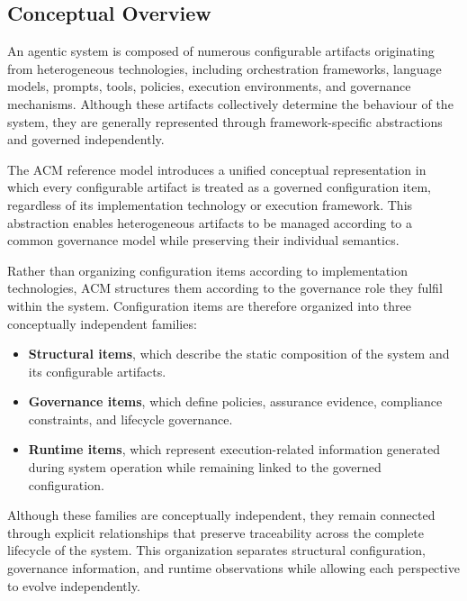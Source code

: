 \documentclass[10pt]{article}
\begin{document}
\subsection{Conceptual Overview}
\label{sec:conceptual_overview}

An agentic system is composed of numerous configurable artifacts originating from heterogeneous technologies, including orchestration frameworks, language models, prompts, tools, policies, execution environments, and governance mechanisms. Although these artifacts collectively determine the behaviour of the system, they are generally represented through framework-specific abstractions and governed independently.

The ACM reference model introduces a unified conceptual representation in which every configurable artifact is treated as a governed configuration item, regardless of its implementation technology or execution framework. This abstraction enables heterogeneous artifacts to be managed according to a common governance model while preserving their individual semantics.

Rather than organizing configuration items according to implementation technologies, ACM structures them according to the governance role they fulfil within the system. Configuration items are therefore organized into three conceptually independent families:

\begin{itemize}

\item \textbf{Structural items}, which describe the static composition of the system and its configurable artifacts.

\item \textbf{Governance items}, which define policies, assurance evidence, compliance constraints, and lifecycle governance.

\item \textbf{Runtime items}, which represent execution-related information generated during system operation while remaining linked to the governed configuration.

\end{itemize}

Although these families are conceptually independent, they remain connected through explicit relationships that preserve traceability across the complete lifecycle of the system. This organization separates structural configuration, governance information, and runtime observations while allowing each perspective to evolve independently.
\end{document}
